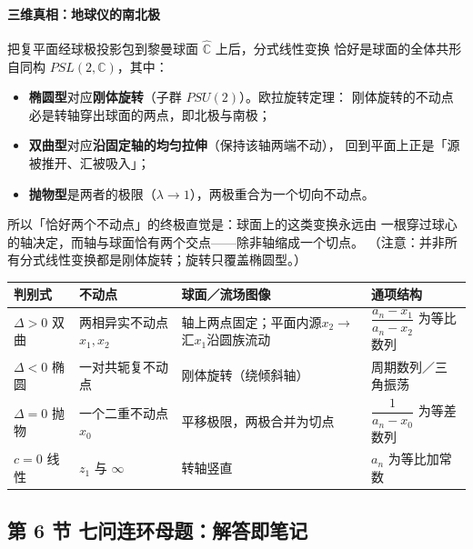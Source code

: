 \begin{advancedonly}
\paragraph{三维真相：地球仪的南北极}
把复平面经球极投影包到黎曼球面 $\hat{\mathbb{C}}$ 上后，分式线性变换
恰好是球面的全体共形自同构 $PSL(2,\mathbb{C})$，其中：
\begin{itemize}
  \item \textbf{椭圆型}对应\textbf{刚体旋转}（子群 $PSU(2)$）。欧拉旋转定理：
  刚体旋转的不动点必是转轴穿出球面的两点，即北极与南极；
  \item \textbf{双曲型}对应\textbf{沿固定轴的均匀拉伸}（保持该轴两端不动），
  回到平面上正是「源被推开、汇被吸入」；
  \item \textbf{抛物型}是两者的极限（$\lambda\to1$），两极重合为一个切向不动点。
\end{itemize}
所以「恰好两个不动点」的终极直觉是：球面上的这类变换永远由
一根穿过球心的轴决定，而轴与球面恰有两个交点——除非轴缩成一个切点。
（注意：并非所有分式线性变换都是刚体旋转；旋转只覆盖椭圆型。）
\end{advancedonly}

\begin{center}
\renewcommand{\arraystretch}{1.35}
\begin{tabular}{|p{2.1cm}|p{3.1cm}|p{3.6cm}|p{4.4cm}|}
\hline
\textbf{判别式} & \textbf{不动点} & \textbf{球面／流场图像} & \textbf{通项结构} \\
\hline
$\Delta>0$ 双曲 & 两相异实不动点 $x_1,x_2$ & 轴上两点固定；平面内源$x_2\to$汇$x_1$沿圆族流动 & $\dfrac{a_n-x_1}{a_n-x_2}$ 为等比数列 \\
\hline
$\Delta<0$ 椭圆 & 一对共轭复不动点 & 刚体旋转（绕倾斜轴） & 周期数列／三角振荡 \\
\hline
$\Delta=0$ 抛物 & 一个二重不动点 $x_0$ & 平移极限，两极合并为切点 & $\dfrac1{a_n-x_0}$ 为等差数列 \\
\hline
$c=0$ 线性 & $z_1$ 与 $\infty$ & 转轴竖直 & $a_n$ 为等比加常数 \\
\hline
\end{tabular}
\end{center}

\subsection{第 6 节 七问连环母题：解答即笔记}

